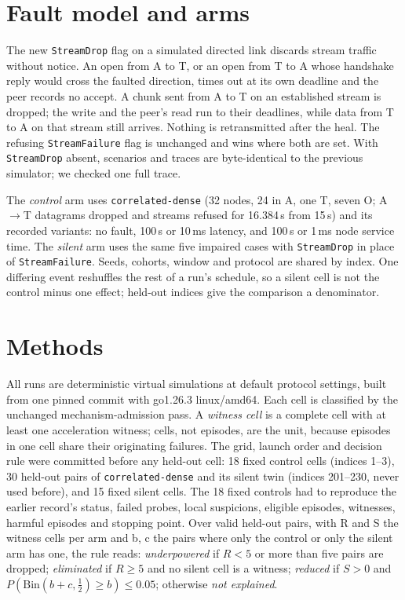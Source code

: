 \documentclass[10pt]{article}
\begin{document}
\section{Fault model and arms}
The new \texttt{StreamDrop} flag on a simulated directed link discards
stream traffic without notice. An open from A to T, or an open from T to A
whose handshake reply would cross the faulted direction, times out at its
own deadline and the peer records no accept. A chunk sent from A to T on
an established stream is dropped; the write and the peer's read run to
their deadlines, while data from T to A on that stream still arrives.
Nothing is retransmitted after the heal. The refusing
\texttt{StreamFailure} flag is unchanged and wins where both are set. With
\texttt{StreamDrop} absent, scenarios and traces are byte-identical to
the previous simulator; we checked one full trace.

The \emph{control} arm uses \texttt{correlated-dense} (32 nodes, 24 in A,
one T, seven O; A$\to$T datagrams dropped and streams refused for
16.384\,s from 15\,s) and its recorded variants: no fault, 100\,\textmu s
or 10\,ms latency, and 100\,\textmu s or 1\,ms node service time. The
\emph{silent} arm uses the same five impaired cases with
\texttt{StreamDrop} in place of \texttt{StreamFailure}. Seeds, cohorts,
window and protocol are shared by index. One differing event reshuffles
the rest of a run's schedule, so a silent cell is not the control minus
one effect; held-out indices give the comparison a denominator.

\section{Methods}
All runs are deterministic virtual simulations at default protocol
settings, built from one pinned commit with go1.26.3 linux/amd64. Each
cell is classified by the unchanged mechanism-admission pass. A
\emph{witness cell} is a complete cell with at least one acceleration
witness; cells, not episodes, are the unit, because episodes in one cell
share their originating failures. The grid, launch order and decision rule
were committed before any held-out cell: 18 fixed control cells (indices
1--3), 30 held-out pairs of \texttt{correlated-dense} and its silent twin
(indices 201--230, never used before), and 15 fixed silent cells. The 18
fixed controls had to reproduce the earlier record's status, failed
probes, local suspicions, eligible episodes, witnesses, harmful episodes
and stopping point. Over valid held-out pairs, with R and S the witness
cells per arm and b, c the pairs where only the control or only the silent
arm has one, the rule reads: \emph{underpowered} if $R<5$ or more than
five pairs are dropped; \emph{eliminated} if $R\ge5$ and no silent cell is
a witness; \emph{reduced} if $S>0$ and $P(\mathrm{Bin}(b+c,\frac12)\ge
b)\le0.05$; otherwise \emph{not explained}.
\end{document}
